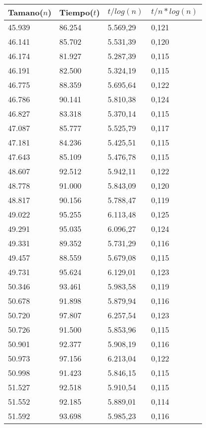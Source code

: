 \begin{table}[H]
\parbox{0.3\textwidth}{
  \begin{tabular}{| l | l | l |l |}
    \hline
    Tamano($n$) & Tiempo($t$) & $t / log(n)$ & $t / n*log(n)$ \\ \hline
45.939	&	86.254	&	5.569,29	&	0,121	\\ \hline
46.141	&	85.702	&	5.531,39	&	0,120	\\ \hline
46.174	&	81.927	&	5.287,39	&	0,115	\\ \hline
46.191	&	82.500	&	5.324,19	&	0,115	\\ \hline
46.775	&	88.359	&	5.695,64	&	0,122	\\ \hline
46.786	&	90.141	&	5.810,38	&	0,124	\\ \hline
46.827	&	83.318	&	5.370,14	&	0,115	\\ \hline
47.087	&	85.777	&	5.525,79	&	0,117	\\ \hline
47.181	&	84.236	&	5.425,51	&	0,115	\\ \hline
47.643	&	85.109	&	5.476,78	&	0,115	\\ \hline
48.607	&	92.512	&	5.942,11	&	0,122	\\ \hline
48.778	&	91.000	&	5.843,09	&	0,120	\\ \hline
48.817	&	90.156	&	5.788,47	&	0,119	\\ \hline
49.022	&	95.255	&	6.113,48	&	0,125	\\ \hline
49.291	&	95.035	&	6.096,27	&	0,124	\\ \hline
49.331	&	89.352	&	5.731,29	&	0,116	\\ \hline
49.457	&	88.559	&	5.679,08	&	0,115	\\ \hline
49.731	&	95.624	&	6.129,01	&	0,123	\\ \hline
50.346	&	93.461	&	5.983,58	&	0,119	\\ \hline
50.678	&	91.898	&	5.879,94	&	0,116	\\ \hline
50.720	&	97.807	&	6.257,54	&	0,123	\\ \hline
50.726	&	91.500	&	5.853,96	&	0,115	\\ \hline
50.901	&	92.377	&	5.908,19	&	0,116	\\ \hline
50.973	&	97.156	&	6.213,04	&	0,122	\\ \hline
50.998	&	91.423	&	5.846,15	&	0,115	\\ \hline
51.527	&	92.518	&	5.910,54	&	0,115	\\ \hline
51.552	&	92.185	&	5.889,01	&	0,114	\\ \hline
51.592	&	93.698	&	5.985,23	&	0,116	\\ \hline

\end{tabular}}
\end{table}
